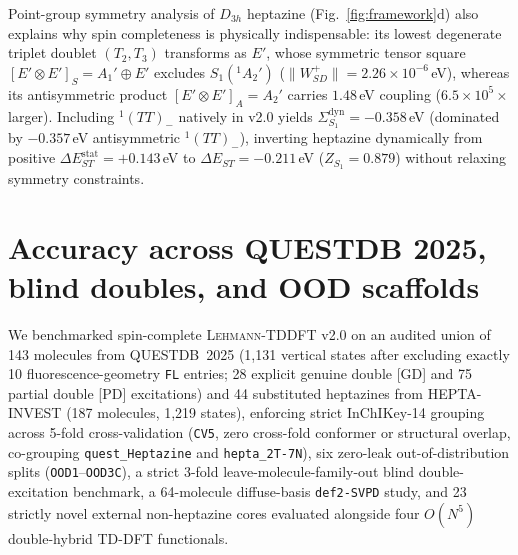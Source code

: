\documentclass[10pt,twocolumn]{article}
\theoremstyle{natthm}
\newcommand{\leh}{\textsc{Lehmann-TDDFT}}
\newcommand{\dEST}{\Delta E_{ST}}
\begin{document}
Point-group symmetry analysis of $D_{3h}$ heptazine (Fig.~\ref{fig:framework}d) also explains why spin completeness is physically indispensable: its lowest degenerate triplet doublet $(T_2,T_3)$ transforms as $E'$, whose symmetric tensor square $[E'\otimes E']_S=A_1'\oplus E'$ excludes $S_1(^1A_2')$ ($\|W_{SD}^+\|=2.26\times 10^{-6}$\,eV), whereas its antisymmetric product $[E'\otimes E']_A=A_2'$ carries $1.48$\,eV coupling ($6.5\times 10^5\times$ larger).
Including $^1(TT)_-$ natively in v2.0 yields $\Sigma_{S_1}^{\mathrm{dyn}}=-0.358$\,eV (dominated by $-0.357$\,eV antisymmetric $^1(TT)_-$), inverting heptazine dynamically from positive $\dEST^{\mathrm{stat}}=+0.143$\,eV to $\dEST=-0.211$\,eV ($Z_{S_1}=0.879$) without relaxing symmetry constraints.

\section*{Accuracy across QUESTDB 2025, blind doubles, and OOD scaffolds}
We benchmarked spin-complete \leh{} v2.0 on an audited union of 143 molecules from QUESTDB~2025\cite{loos2018mountaineering,chrayteh2021,veril2021quest,kossoski2024doubles,loos2025quest} (1,131 vertical states after excluding exactly 10 fluorescence-geometry \texttt{FL} entries; 28 explicit genuine double [GD] and 75 partial double [PD] excitations) and 44 substituted heptazines from HEPTA-INVEST\cite{rishi2025} (187 molecules, 1,219 states), enforcing strict InChIKey-14 grouping across 5-fold cross-validation (\texttt{CV5}, zero cross-fold conformer or structural overlap, co-grouping \texttt{quest\_Heptazine} and \texttt{hepta\_2T-7N}), six zero-leak out-of-distribution splits (\texttt{OOD1}--\texttt{OOD3C}), a strict 3-fold leave-molecule-family-out blind double-excitation benchmark, a 64-molecule diffuse-basis \texttt{def2-SVPD} study, and 23 strictly novel external non-heptazine cores evaluated alongside four $O(N^5)$ double-hybrid TD-DFT functionals\cite{grimme2007,casanovapaez2021}.
\end{document}
